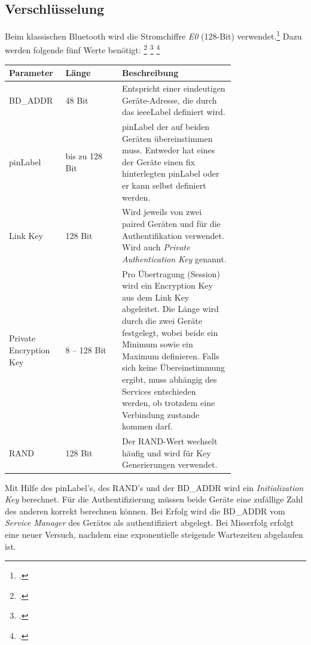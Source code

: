 \newpage
\subsection{Verschlüsselung}
Beim klassischen Bluetooth wird die Stromchiffre \textit{E0} (128-Bit) verwendet.\footcite{E0_cipher_Wikipedia_2015-04-27}
Dazu werden folgende fünf Werte benötigt:
\footcite{LE_Security_Bluetooth_Development_Portal_2015-04-25}
\footcite{Bluetooth_Communication_Hybrid_Encryption_2015-04-25}
\footcite{BluetoothSecurity_Washington_2015-04-25}

\begin{table}[H]
	\small\sffamily\renewcommand{\arraystretch}{1.4}
	\begin{tabular}{p{0.25\linewidth}lp{0.5\linewidth}}
		\toprule
		Parameter & Länge & Beschreibung \\
		\midrule
		BD\_ADDR & 48 Bit & Entspricht einer eindeutigen Geräte-Adresse, die durch das \gls{ieeeLabel} definiert wird.\\
		\gls{pinLabel} & bis zu 128 Bit & \gls{pinLabel} der auf beiden Geräten übereinstimmen muss. Entweder hat eines der Geräte einen fix hinterlegten \gls{pinLabel} oder er kann selbst definiert werden.\\
		Link Key & 128 Bit  & Wird jeweils von zwei paired Geräten und für die Authentifikation verwendet. Wird auch \textit{Private Authentication Key} genannt.\\
		Private Encryption Key & 8 -- 128 Bit & Pro Übertragung (Session) wird ein Encryption Key aus dem Link Key abgeleitet. Die Länge wird durch die zwei Geräte festgelegt, wobei beide ein Minimum sowie ein Maximum definieren. Falls sich keine Übereinstimmung ergibt, muss abhängig des Services entschieden werden, ob trotzdem eine Verbindung zustande kommen darf. \\
		RAND & 128 Bit & Der RAND-Wert wechselt häufig und wird für Key Generierungen verwendet.\\
		\bottomrule
	\end{tabular}
\end{table}

Mit Hilfe des \gls{pinLabel}'s, des RAND's und der BD\_ADDR wird ein \textit{Initialization Key} berechnet.
Für die Authentifizierung müssen beide Geräte eine zufällige Zahl des anderen korrekt berechnen können.
Bei Erfolg wird die BD\_ADDR vom \textit{Service Manager} des Gerätes als authentifiziert abgelegt.
Bei Misserfolg erfolgt eine neuer Versuch, nachdem eine exponentielle steigende Wartezeiten abgelaufen ist.

